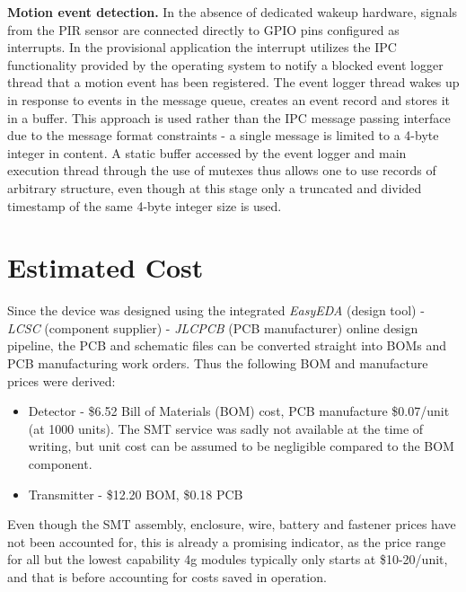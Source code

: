 \documentclass[10pt,nocopyrightspace]{ewsn-proc}
\begin{document}
\textbf{Motion event detection.}
In the absence of dedicated wakeup hardware, signals from the PIR sensor are connected directly to GPIO pins configured as interrupts. In the provisional application the interrupt utilizes the IPC functionality provided by the operating system to notify a blocked event logger thread that a motion event has been registered. The event logger thread wakes up in response to events in the message queue, creates an event record and stores it in a buffer. This approach is used rather than the IPC message passing interface due to the message format constraints - a single message is limited to a 4-byte integer in content. A static buffer accessed by the event logger and main execution thread through the use of mutexes thus allows one to use records of arbitrary structure, even though at this stage only a truncated and divided timestamp of the same 4-byte integer size is used. 

\section{Estimated Cost}
Since the device was designed using the integrated \textit{EasyEDA} (design tool) - \textit{LCSC} (component supplier) - \textit{JLCPCB} (PCB manufacturer) online design pipeline, the PCB and schematic files can be converted straight into BOMs and PCB manufacturing work orders. Thus the following BOM and manufacture prices were derived:

\begin{itemize}
\item Detector - \$6.52 Bill of Materials (BOM) cost, PCB manufacture \$0.07/unit (at 1000 units). The SMT service was sadly not available at the time of writing, but unit cost can be assumed to be negligible compared to the BOM component.
\item Transmitter - \$12.20 BOM, \$0.18 PCB
\end{itemize}

Even though the SMT assembly, enclosure, wire, battery and fastener prices have not been accounted for, this is already a promising indicator, as the price range for all but the lowest capability 4g modules typically only starts at \$10-20/unit, and that is before accounting for costs saved in operation. 
\end{document}
